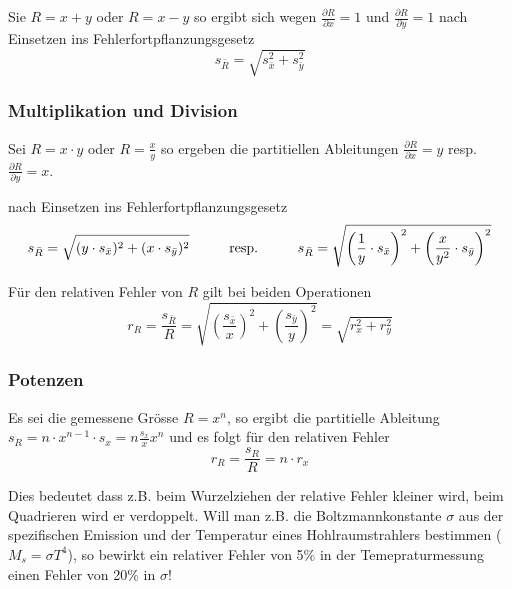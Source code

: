 Sie $R=x+y$ oder $R=x-y$ so ergibt sich wegen $\frac{\partial R}{\partial x} = 1$ und $\frac{\partial R}{\partial y} = 1$
nach Einsetzen ins Fehlerfortpflanzungsgesetz
\begin{equation}
    s_{\bar{R}} = \sqrt{ s_{\bar{x}}^2 + s_{\bar{y}}^2 }
\end{equation}


\subsubsection{Multiplikation und Division}

Sei $R=x \cdot y$ oder $R=\frac{x}{y}$ so ergeben die partitiellen Ableitungen $\frac{\partial R}{\partial x} = y$
resp. $\frac{\partial R}{\partial y} = x$.

nach Einsetzen ins Fehlerfortpflanzungsgesetz
\begin{equation}
    s_{\bar{R}} = \sqrt{ (y \cdot s_{\bar{x}})^2 + (x \cdot s_{\bar{y}})^2 }
    \hspace{10mm} \textrm{resp.} \hspace{10mm}
    s_{\bar{R}} = \sqrt{ \left( \frac{1}{y} \cdot s_{\bar{x}} \right)^2 + \left( \frac{x}{y^2} \cdot s_{\bar{y}} \right)^2 }
\end{equation}

F\"ur den relativen Fehler von $R$ gilt bei beiden Operationen
\begin{equation}
    r_R = \frac{s_{\bar{R}}}{R} = \sqrt{ \left( \frac{s_{\bar{x}}}{x} \right)^2 + \left( \frac{s_{\bar{y}}}{y} \right)^2 } = \sqrt{ r_x^2 + r_y^2 }
\end{equation}


\subsubsection{Potenzen}

Es sei die gemessene Gr\"osse $R=x^n$, so ergibt die partitielle Ableitung $s_R = n \cdot x^{n-1} \cdot s_x = n \frac{s_x}{x} x^n$
und es folgt f\"ur den relativen Fehler
\begin{equation}
    r_R = \frac{s_R}{R} = n \cdot r_x
\end{equation}

Dies bedeutet dass z.B. beim Wurzelziehen der relative Fehler kleiner wird, beim Quadrieren wird
er verdoppelt. Will man z.B. die Boltzmannkonstante $\sigma$ aus der spezifischen Emission und der
Temperatur eines Hohlraumstrahlers bestimmen ($M_s = \sigma T^4$), so bewirkt ein relativer
Fehler von 5\% in der Temepraturmessung einen Fehler von 20\% in $\sigma$!

